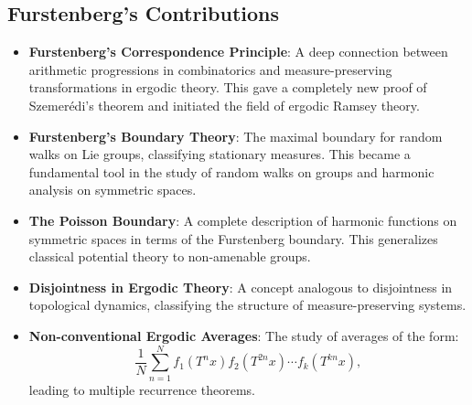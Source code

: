 \subsection{Furstenberg's Contributions}
\begin{itemize}
\item \textbf{Furstenberg's Correspondence Principle}: A deep connection between arithmetic progressions in combinatorics and measure-preserving transformations in ergodic theory. This gave a completely new proof of Szemer\'edi's theorem and initiated the field of ergodic Ramsey theory.
\item \textbf{Furstenberg's Boundary Theory}: The maximal boundary for random walks on Lie groups, classifying stationary measures. This became a fundamental tool in the study of random walks on groups and harmonic analysis on symmetric spaces.
\item \textbf{The Poisson Boundary}: A complete description of harmonic functions on symmetric spaces in terms of the Furstenberg boundary. This generalizes classical potential theory to non-amenable groups.
\item \textbf{Disjointness in Ergodic Theory}: A concept analogous to disjointness in topological dynamics, classifying the structure of measure-preserving systems.
\item \textbf{Non-conventional Ergodic Averages}: The study of averages of the form:
\[
\frac{1}{N} \sum_{n=1}^N f_1(T^n x) f_2(T^{2n} x) \cdots f_k(T^{kn} x),
\]
leading to multiple recurrence theorems.
\end{itemize}

